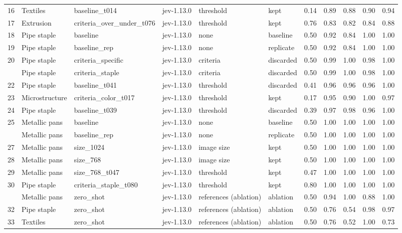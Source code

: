 \begin{table}
\begin{tabular}[t]{rlllllrrrrr}
16 & Textiles & baseline\_t014 & jev-1.13.0 & threshold & kept & 0.14 & 0.89 & 0.88 & 0.90 & 0.94\\
17 & Extrusion & criteria\_over\_under\_t076 & jev-1.13.0 & threshold & kept & 0.76 & 0.83 & 0.82 & 0.84 & 0.88\\
18 & Pipe staple & baseline & jev-1.13.0 & none & baseline & 0.50 & 0.92 & 0.84 & 1.00 & 1.00\\
19 & Pipe staple & baseline\_rep & jev-1.13.0 & none & replicate & 0.50 & 0.92 & 0.84 & 1.00 & 1.00\\
20 & Pipe staple & criteria\_specific & jev-1.13.0 & criteria & discarded & 0.50 & 0.99 & 1.00 & 0.98 & 1.00\\
\addlinespace
21 & Pipe staple & criteria\_staple & jev-1.13.0 & criteria & discarded & 0.50 & 0.99 & 1.00 & 0.98 & 1.00\\
22 & Pipe staple & baseline\_t041 & jev-1.13.0 & threshold & discarded & 0.41 & 0.96 & 0.96 & 0.96 & 1.00\\
23 & Microstructure & criteria\_color\_t017 & jev-1.13.0 & threshold & kept & 0.17 & 0.95 & 0.90 & 1.00 & 0.97\\
24 & Pipe staple & baseline\_t039 & jev-1.13.0 & threshold & discarded & 0.39 & 0.97 & 0.98 & 0.96 & 1.00\\
25 & Metallic pans & baseline & jev-1.13.0 & none & baseline & 0.50 & 1.00 & 1.00 & 1.00 & 1.00\\
\addlinespace
26 & Metallic pans & baseline\_rep & jev-1.13.0 & none & replicate & 0.50 & 1.00 & 1.00 & 1.00 & 1.00\\
27 & Metallic pans & size\_1024 & jev-1.13.0 & image size & kept & 0.50 & 1.00 & 1.00 & 1.00 & 1.00\\
28 & Metallic pans & size\_768 & jev-1.13.0 & image size & kept & 0.50 & 1.00 & 1.00 & 1.00 & 1.00\\
29 & Metallic pans & size\_768\_t047 & jev-1.13.0 & threshold & kept & 0.47 & 1.00 & 1.00 & 1.00 & 1.00\\
30 & Pipe staple & criteria\_staple\_t080 & jev-1.13.0 & threshold & kept & 0.80 & 1.00 & 1.00 & 1.00 & 1.00\\
\addlinespace
31 & Metallic pans & zero\_shot & jev-1.13.0 & references (ablation) & ablation & 0.50 & 0.94 & 1.00 & 0.88 & 1.00\\
32 & Pipe staple & zero\_shot & jev-1.13.0 & references (ablation) & ablation & 0.50 & 0.76 & 0.54 & 0.98 & 0.97\\
33 & Textiles & zero\_shot & jev-1.13.0 & references (ablation) & ablation & 0.50 & 0.76 & 0.52 & 1.00 & 0.73\\

\end{tabular}
\end{table}
